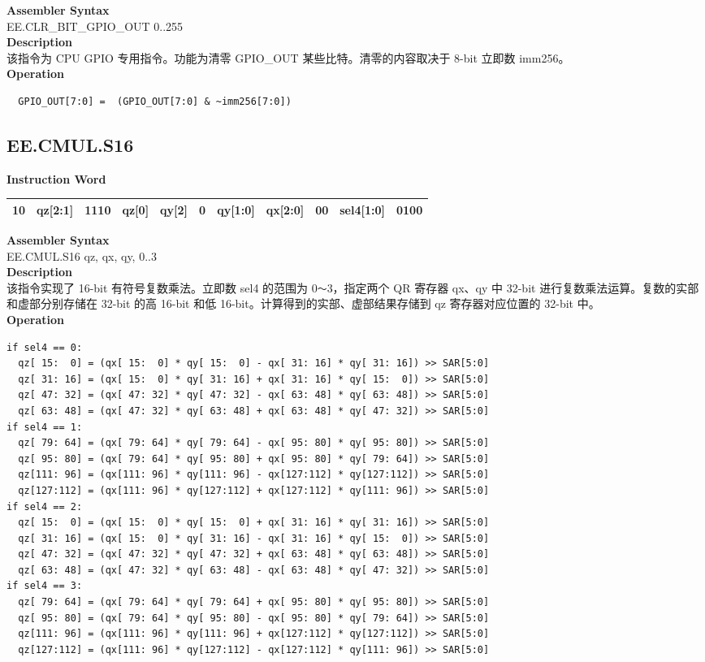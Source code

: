 \textbf{Assembler Syntax} \\
EE.CLR\_BIT\_GPIO\_OUT 0..255 \\
\textbf{Description} \\
该指令为 CPU GPIO 专用指令。功能为清零 GPIO\_OUT 某些比特。清零的内容取决于 8-bit 立即数 imm256。\\
\textbf{Operation}
\begin{lstlisting}
  GPIO_OUT[7:0] =  (GPIO_OUT[7:0] & ~imm256[7:0])
\end{lstlisting}

\clearpage
\subsection{EE.CMUL.S16}\label{instruction:EECMULS16}
\setlength\tabcolsep{6pt}
\textbf{Instruction Word} \\
\begin{tabular}{|c|c|c|c|c|c|c|c|c|c|c|}
	\hline
	10 & qz[2:1] & 1110 & qz[0] & qy[2] & 0 & qy[1:0] & qx[2:0] & 00 & sel4[1:0] & 0100 \\
	\hline
\end{tabular}

\textbf{Assembler Syntax} \\
EE.CMUL.S16 qz, qx, qy, 0..3 \\
\textbf{Description} \\
该指令实现了 16-bit 有符号复数乘法。立即数 sel4 的范围为 0\verb+～+3，指定两个 QR 寄存器 qx、qy 中 32-bit 进行复数乘法运算。复数的实部和虚部分别存储在 32-bit 的高 16-bit 和低 16-bit。计算得到的实部、虚部结果存储到 qz 寄存器对应位置的 32-bit 中。\\
\textbf{Operation}
\begin{lstlisting}
if sel4 == 0:
  qz[ 15:  0] = (qx[ 15:  0] * qy[ 15:  0] - qx[ 31: 16] * qy[ 31: 16]) >> SAR[5:0]
  qz[ 31: 16] = (qx[ 15:  0] * qy[ 31: 16] + qx[ 31: 16] * qy[ 15:  0]) >> SAR[5:0]
  qz[ 47: 32] = (qx[ 47: 32] * qy[ 47: 32] - qx[ 63: 48] * qy[ 63: 48]) >> SAR[5:0]
  qz[ 63: 48] = (qx[ 47: 32] * qy[ 63: 48] + qx[ 63: 48] * qy[ 47: 32]) >> SAR[5:0]
if sel4 == 1:
  qz[ 79: 64] = (qx[ 79: 64] * qy[ 79: 64] - qx[ 95: 80] * qy[ 95: 80]) >> SAR[5:0]
  qz[ 95: 80] = (qx[ 79: 64] * qy[ 95: 80] + qx[ 95: 80] * qy[ 79: 64]) >> SAR[5:0]
  qz[111: 96] = (qx[111: 96] * qy[111: 96] - qx[127:112] * qy[127:112]) >> SAR[5:0]
  qz[127:112] = (qx[111: 96] * qy[127:112] + qx[127:112] * qy[111: 96]) >> SAR[5:0]
if sel4 == 2:
  qz[ 15:  0] = (qx[ 15:  0] * qy[ 15:  0] + qx[ 31: 16] * qy[ 31: 16]) >> SAR[5:0]
  qz[ 31: 16] = (qx[ 15:  0] * qy[ 31: 16] - qx[ 31: 16] * qy[ 15:  0]) >> SAR[5:0]
  qz[ 47: 32] = (qx[ 47: 32] * qy[ 47: 32] + qx[ 63: 48] * qy[ 63: 48]) >> SAR[5:0]
  qz[ 63: 48] = (qx[ 47: 32] * qy[ 63: 48] - qx[ 63: 48] * qy[ 47: 32]) >> SAR[5:0]
if sel4 == 3:
  qz[ 79: 64] = (qx[ 79: 64] * qy[ 79: 64] + qx[ 95: 80] * qy[ 95: 80]) >> SAR[5:0]
  qz[ 95: 80] = (qx[ 79: 64] * qy[ 95: 80] - qx[ 95: 80] * qy[ 79: 64]) >> SAR[5:0]
  qz[111: 96] = (qx[111: 96] * qy[111: 96] + qx[127:112] * qy[127:112]) >> SAR[5:0]
  qz[127:112] = (qx[111: 96] * qy[127:112] - qx[127:112] * qy[111: 96]) >> SAR[5:0]
\end{lstlisting}

